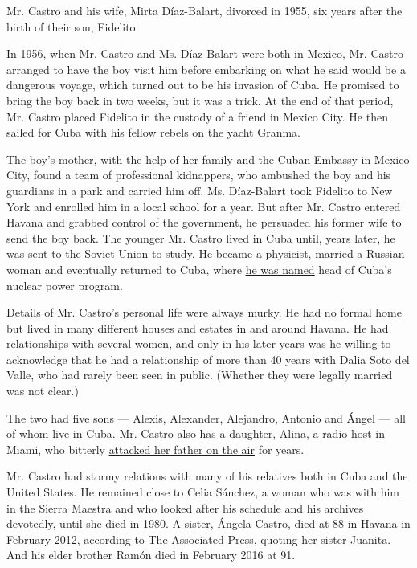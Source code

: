 Mr. Castro and his wife, Mirta Díaz-Balart, divorced in 1955, six years
after the birth of their son, Fidelito.

In 1956, when Mr. Castro and Ms. Díaz-Balart were both in Mexico, Mr.
Castro arranged to have the boy visit him before embarking on what he
said would be a dangerous voyage, which turned out to be his invasion of
Cuba. He promised to bring the boy back in two weeks, but it was a
trick. At the end of that period, Mr. Castro placed Fidelito in the
custody of a friend in Mexico City. He then sailed for Cuba with his
fellow rebels on the yacht Granma.

The boy's mother, with the help of her family and the Cuban Embassy in
Mexico City, found a team of professional kidnappers, who ambushed the
boy and his guardians in a park and carried him off. Ms. Díaz-Balart
took Fidelito to New York and enrolled him in a local school for a year.
But after Mr. Castro entered Havana and grabbed control of the
government, he persuaded his former wife to send the boy back. The
younger Mr. Castro lived in Cuba until, years later, he was sent to the
Soviet Union to study. He became a physicist, married a Russian woman
and eventually returned to Cuba, where
\href{http://www.nytimes.com/1981/11/20/nyregion/notes-on-people-a-castro-reappears-after-long-silence.html}{he
was named} head of Cuba's nuclear power program.

Details of Mr. Castro's personal life were always murky. He had no
formal home but lived in many different houses and estates in and around
Havana. He had relationships with several women, and only in his later
years was he willing to acknowledge that he had a relationship of more
than 40 years with Dalia Soto del Valle, who had rarely been seen in
public. (Whether they were legally married was not clear.)

The two had five sons --- Alexis, Alexander, Alejandro, Antonio and
Ángel --- all of whom live in Cuba. Mr. Castro also has a daughter,
Alina, a radio host in Miami, who bitterly
\href{http://www.nytimes.com/2002/03/22/us/on-the-air-in-miami-castro-s-rebellious-daughter.html}{attacked
her father on the air} for years.

Mr. Castro had stormy relations with many of his relatives both in Cuba
and the United States. He remained close to Celia Sánchez, a woman who
was with him in the Sierra Maestra and who looked after his schedule and
his archives devotedly, until she died in 1980. A sister, Ángela Castro,
died at 88 in Havana in February 2012, according to The Associated
Press, quoting her sister Juanita. And his elder brother Ramón died in
February 2016 at 91.

